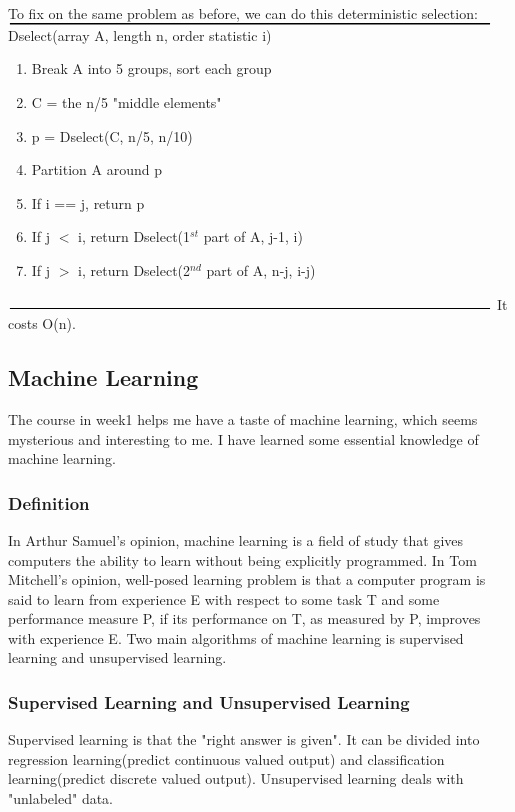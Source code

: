 \documentclass{article}
\begin{document}
\\
To fix on the same problem as before, we can do this deterministic selection:\\
$\rule{\textwidth}{0.3mm}$
Dselect(array A, length n, order statistic i)
\begin{enumerate}
  \item Break A into 5 groups, sort each group
  \item C = the n/5 "middle elements"
  \item p = Dselect(C, n/5, n/10)
  \item Partition A around p
  \item If i == j, return p
  \item If j $<$ i, return Dselect(1$^{st}$ part of A, j-1, i)
  \item If j $>$ i, return Dselect(2$^{nd}$ part of A, n-j, i-j)
\end{enumerate}
$\rule{\textwidth}{0.3mm}$
It costs O(n).

\subsection{Machine Learning}
The course in week1 helps me have a taste of machine learning, which seems mysterious and interesting to me. I have learned some essential knowledge of machine learning.

\subsubsection{Definition}
In Arthur Samuel's opinion, machine learning is a field of study that gives computers the ability to learn without being explicitly programmed. In Tom Mitchell's opinion, well-posed learning problem is that a computer program is said to learn from experience E with respect to some task T and some performance measure P, if its performance on T, as measured by P, improves with experience E. Two main algorithms of machine learning is supervised learning and unsupervised learning.

\subsubsection{Supervised Learning and Unsupervised Learning}
Supervised learning is that the "right answer is given". It can be divided into regression learning(predict continuous valued output) and classification learning(predict discrete valued output). Unsupervised learning deals with "unlabeled" data.
\end{document}
